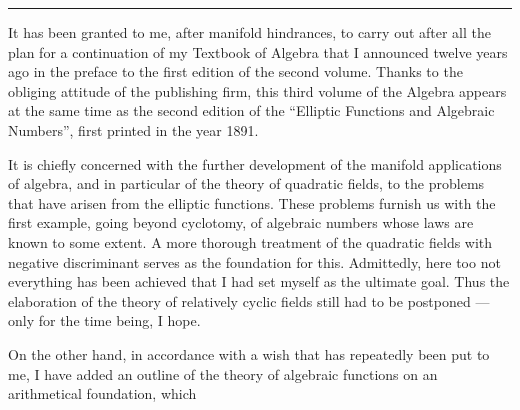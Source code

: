 \vspace*{6cm}
\begin{center}
{\Large {}}

\vspace{1em}
\rule{2cm}{0.4pt}
\end{center}
\vspace{2em}

It has been granted to me, after manifold hindrances, to carry out after all the plan for a continuation of my Textbook of Algebra that I announced twelve years ago in the preface to the first edition of the second volume. Thanks to the obliging attitude of the publishing firm, this third volume of the Algebra appears at the same time as the second edition of the ``Elliptic Functions and Algebraic Numbers'', first printed in the year 1891.

It is chiefly concerned with the further development of the manifold applications of algebra, and in particular of the theory of quadratic fields, to the problems that have arisen from the elliptic functions. These problems furnish us with the first example, going beyond cyclotomy, of algebraic numbers whose laws are known to some extent. A more thorough treatment of the quadratic fields with negative discriminant serves as the foundation for this. Admittedly, here too not everything has been achieved that I had set myself as the ultimate goal. Thus the elaboration of the theory of relatively cyclic fields still had to be postponed --- only for the time being, I hope.

On the other hand, in accordance with a wish that has repeatedly been put to me, I have added an outline of the theory of algebraic functions on an arithmetical foundation, which

